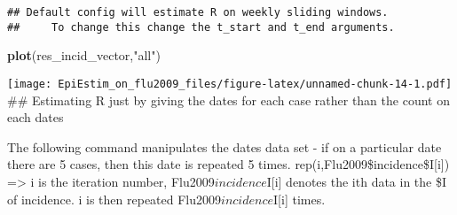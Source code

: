 \documentclass[
]{article}
\newenvironment{Shaded}{\begin{snugshade}}{\end{snugshade}}
\newcommand{\AttributeTok}[1]{\textcolor[rgb]{0.13,0.29,0.53}{#1}}
\newcommand{\ControlFlowTok}[1]{\textcolor[rgb]{0.13,0.29,0.53}{\textbf{#1}}}
\newcommand{\FunctionTok}[1]{\textcolor[rgb]{0.13,0.29,0.53}{\textbf{#1}}}
\newcommand{\NormalTok}[1]{#1}
\newcommand{\OtherTok}[1]{\textcolor[rgb]{0.56,0.35,0.01}{#1}}
\newcommand{\SpecialCharTok}[1]{\textcolor[rgb]{0.81,0.36,0.00}{\textbf{#1}}}
\newcommand{\StringTok}[1]{\textcolor[rgb]{0.31,0.60,0.02}{#1}}
\begin{document}
\begin{verbatim}
## Default config will estimate R on weekly sliding windows.
##     To change this change the t_start and t_end arguments.
\end{verbatim}

\begin{Shaded}
\begin{Highlighting}[]
\FunctionTok{plot}\NormalTok{(res\_incid\_vector,}\StringTok{"all"}\NormalTok{)}
\end{Highlighting}
\end{Shaded}

\texttt{[image: EpiEstim\_on\_flu2009\_files/figure-latex/unnamed-chunk-14-1.pdf]}
\#\# Estimating R just by giving the dates for each case rather than the
count on each dates

The following command manipulates the dates data set - if on a
particular date there are 5 cases, then this date is repeated 5 times.
rep(i,Flu2009\$incidence\$I{[}i{]}) =\textgreater{} i is the iteration
number, Flu2009\(incidence\)I{[}i{]} denotes the ith data in the \$I of
incidence. i is then repeated Flu2009\(incidence\)I{[}i{]} times.

\begin{Shaded}
\end{Shaded}
\end{document}

